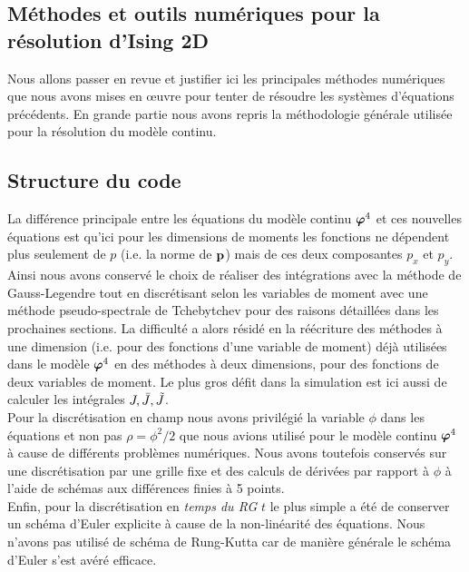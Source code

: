 \documentclass[10.5pt]{article}
\begin{document}
\begin{multicols}{2}
\vspace*{11pt}

\section{Méthodes et outils numériques pour la résolution d'Ising 2D}

\label{sec:NumIsing}
Nous allons passer en revue et justifier ici les principales méthodes numériques que nous avons mises en œuvre pour tenter de résoudre les systèmes d'équations précédents. En grande partie nous avons repris la méthodologie générale utilisée pour la résolution du modèle continu.


\subsection{Structure du code}

La différence principale entre les équations du modèle continu $\boldsymbol{ \varphi}^4$ et ces nouvelles équations est qu'ici pour les dimensions de moments les fonctions ne dépendent plus seulement de $p$ (i.e. la norme de ${\bf p}$) mais de ces deux composantes $p_x$ et $p_y$. Ainsi nous avons conservé le choix de réaliser des intégrations avec la méthode de Gauss-Legendre tout en discrétisant selon les variables de moment avec une méthode pseudo-spectrale de Tchebytchev pour des raisons détaillées dans les prochaines sections. La difficulté a alors résidé en la réécriture des méthodes à une dimension (i.e. pour des fonctions d'une variable de moment) déjà utilisées dans le modèle $ \boldsymbol{ \varphi}^4$ en des méthodes à deux dimensions, pour des fonctions de deux variables de moment. Le plus gros défit dans la simulation est ici aussi de calculer les intégrales $J, \bar{J}, \tilde{J}$. \\

Pour la discrétisation en champ nous avons privilégié la variable $\phi$ dans les équations et non pas $\rho = \phi^2/2$ que nous avions utilisé pour le modèle continu $\boldsymbol{ \varphi}^4$ à cause de différents problèmes numériques. Nous avons toutefois conservés sur une discrétisation par une grille fixe et des calculs de dérivées par rapport à $\phi$ à l'aide de schémas aux différences finies à 5 points. \\


Enfin, pour la discrétisation en \textit{temps du RG} $t$ le plus simple a été de conserver un schéma d'Euler explicite à cause de la non-linéarité des équations. Nous n'avons pas utilisé de schéma de Rung-Kutta car de manière générale le schéma d'Euler s'est avéré efficace.\\


\end{multicols}
\end{document}
